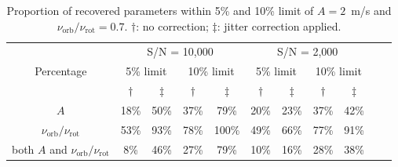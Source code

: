 \begin{table}[h!]
\centering
\begin{tabular}{|c|c|c|c|c|c|c|c|c|ll}
\cline{1-9}
\multirow{3}{*}{Percentage} & \multicolumn{4}{c|}{S/N = 10,000}                        & \multicolumn{4}{c|}{S/N = 2,000}                         &  &  \\ \cline{2-9}
                            & \multicolumn{2}{c|}{5\% limit} & \multicolumn{2}{c|}{10\% limit} & \multicolumn{2}{c|}{5\% limit} & \multicolumn{2}{c|}{10\% limit} &  &  \\ \cline{2-9}
                            				& $\dagger$     & $\ddagger$   & $\dagger$           & $\ddagger$           & $\dagger$           & $\ddagger$          & $\dagger$            & $\ddagger$          &  &  \\ \cline{1-9}
$A$                         					& 18\%            & 50\%           & 37\%            & 79\%            & 20\%            & 23\%           & 37\%             & 42\%           &  &  \\ \cline{1-9}
$\nu_\text{orb}/\nu_\text{rot}$              	& 53\%            & 93\%           & 78\%            & 100\%            & 49\%            & 66\%           & 77\%             & 91\%           &  &  \\ \cline{1-9}
both $A$ and $\nu_\text{orb}/\nu_\text{rot}$    & 8\%             & 46\%           & 27\%            & 79\%            & 10\%            & 16\%           & 28\%             & 38\%           &  &  \\ \cline{1-9}
\end{tabular}
\caption{Proportion of recovered parameters within 5\% and 10\% limit of $A = 2$~m/s and $\nu_\text{orb}/\nu_\text{rot} =0.7$. $\dagger$: no correction; $\ddagger$: jitter correction applied.}
\label{table:a=2}
\end{table}


\FloatBarrier

